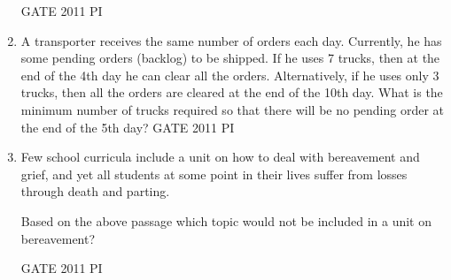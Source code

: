 \documentclass[journal,12pt,onecolumn]{IEEEtran}
\theoremstyle{remark}
\begin{document}
\begin{enumerate}
\hfill{GATE 2011 PI}
\begin{enumerate}
\end{enumerate}
\item A transporter receives the same number of orders each day. Currently, he has some pending orders (backlog) to be shipped. If he uses 7 trucks, then at the end of the 4th day he can clear all the orders. Alternatively, if he uses only 3 trucks, then all the orders are cleared at the end of the 10th day. What is the minimum number of trucks required so that there will be no pending order at the end of the 5th day?
\hfill{GATE 2011 PI}
\begin{enumerate}
\end{enumerate}

\item Few school curricula include a unit on how to deal with bereavement and grief, and yet all students at some point in their lives suffer from losses through death and parting.

Based on the above passage which topic would not be included in a unit on bereavement?

\hfill{GATE 2011 PI}
\begin{enumerate}
\end{enumerate}


\end{enumerate}
\end{document}
